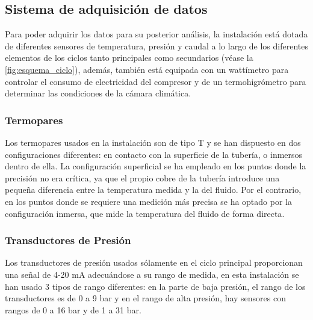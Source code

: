 \documentclass[../main.tex]{subfiles}
\begin{document}
\begin{table}[ht]
    
    \caption{Características de los componentes de los ciclos secundarios}
    \label{tab:ciclos_secundarios}
\end{table}

\FloatBarrier

\newpage


\subsection{Sistema de adquisición de datos}

Para poder adquirir los datos para su posterior análisis, la instalación está dotada de diferentes sensores de temperatura, presión y caudal a lo largo de los diferentes elementos de los ciclos tanto principales como secundarios (véase la \autoref{fig:esquema_ciclo}), además, también está equipada con un wattímetro para controlar el consumo de electricidad del compresor y de un termohigrómetro para determinar las condiciones de la cámara climática.

\subsubsection{Termopares}

Los termopares usados en la instalación son de tipo T y se han dispuesto en dos configuraciones diferentes: en contacto con la superficie de la tubería, o inmersos dentro de ella. La configuración superficial se ha empleado en los puntos donde la precisión no era crítica, ya que el propio cobre de la tubería introduce una pequeña diferencia entre la temperatura medida y la del fluido. Por el contrario, en los puntos donde se requiere una medición más precisa se ha optado por la configuración inmersa, que mide la temperatura del fluido de forma directa.

\subsubsection{Transductores de Presión}

Los transductores de presión usados sólamente en el ciclo principal proporcionan una señal de 4-20 mA adecuándose a su rango de medida, en esta instalación se han usado 3 tipos de rango diferentes: en la parte de baja presión, el rango de los transductores es de 0 a 9 bar y en el rango de alta presión, hay sensores con rangos de 0 a 16 bar y de 1 a 31 bar.
\end{document}

